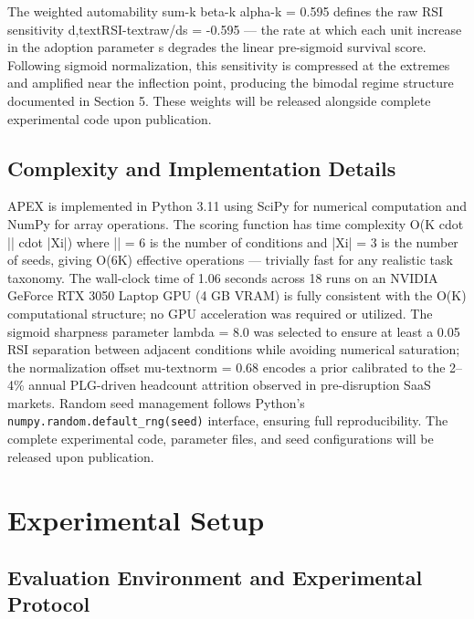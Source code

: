 \documentclass[10pt, conference]{IEEEtran}
\begin{document}
The weighted automability sum-k beta-k alpha-k = 0.595 defines the raw RSI sensitivity d,textRSI-textraw/ds = -0.595 --- the rate at which each unit increase in the adoption parameter s degrades the linear pre-sigmoid survival score. Following sigmoid normalization, this sensitivity is compressed at the extremes and amplified near the inflection point, producing the bimodal regime structure documented in Section 5. These weights will be released alongside complete experimental code upon publication.

\subsection{Complexity and Implementation Details}

\label{sec:complexity\_and\_implementation\_details}

APEX is implemented in Python 3.11 using SciPy \cite{virtanen2020scipy} for numerical computation and NumPy for array operations. The scoring function has time complexity O(K cdot || cdot |Xi|) where || = 6 is the number of conditions and |Xi| = 3 is the number of seeds, giving O(6K) effective operations --- trivially fast for any realistic task taxonomy. The wall-clock time of 1.06 seconds across 18 runs on an NVIDIA GeForce RTX 3050 Laptop GPU (4 GB VRAM) is fully consistent with the O(K) computational structure; no GPU acceleration was required or utilized. The sigmoid sharpness parameter lambda = 8.0 was selected to ensure at least a 0.05 RSI separation between adjacent conditions while avoiding numerical saturation; the normalization offset mu-textnorm = 0.68 encodes a prior calibrated to the 2--4\% annual PLG-driven headcount attrition observed in pre-disruption SaaS markets. Random seed management follows Python's \texttt{numpy.random.default\_rng(seed)} interface, ensuring full reproducibility. The complete experimental code, parameter files, and seed configurations will be released upon publication.

\section{Experimental Setup}

\label{sec:experimental\_setup}

\subsection{Evaluation Environment and Experimental Protocol}
\end{document}
